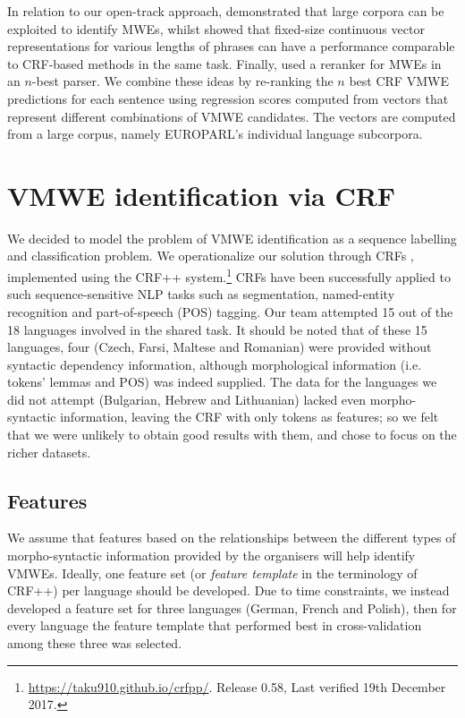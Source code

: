 \documentclass[output=paper
,modfonts
,nonflat]{langsci/langscibook}
\begin{document}
In relation to our open-track approach, \cite{attia2010automatic} demonstrated that large corpora can be exploited to identify MWEs, whilst \cite{legrand2016phrase} showed that fixed-size continuous vector representations for various lengths of phrases can have a performance comparable to CRF-based methods in the same task. Finally, \cite{Constant2012} used a reranker for MWEs in an $n$-best parser. We combine these ideas by re-ranking the $n$ best CRF VMWE predictions for each sentence using regression scores computed from vectors that represent different combinations of VMWE candidates. The vectors are computed from a large corpus, namely EUROPARL's individual language subcorpora.  %


\section{\label{subsec:CRF}VMWE identification via CRF}

We decided to model the problem of VMWE identification as a sequence
labelling and classification problem. We operationalize our solution
through CRFs \citep{Lafferty2001}, implemented using the
CRF++ system.\footnote{\url{https://taku910.github.io/crfpp/}. Release 0.58, Last verified 19th December 2017.} CRFs have
been successfully applied to such sequence-sensitive NLP tasks such as
segmentation, named-entity
recognition \citep{han2013chinese,han2015chinese} and part-of-speech (POS)
tagging. Our team attempted 15 out of the 18 languages involved in the
shared task.  It should be noted that of these 15 languages, four
(Czech, Farsi, Maltese and Romanian) were provided without syntactic
dependency information, although morphological information
(i.e. tokens' lemmas and POS) was indeed supplied.
The data for the languages we did not attempt (Bulgarian, Hebrew and
Lithuanian) lacked even morpho-syntactic information, leaving the CRF
with only tokens as features; so we felt that we were unlikely to
obtain good results with them, and chose to focus on the richer
datasets. 



\subsection{Features}

We assume that features based on the relationships between the
different types of morpho-syntactic information provided by the
organisers will help identify VMWEs. Ideally, one feature set (or
\emph{feature template} in the terminology of CRF++) per language
should be developed. Due to time constraints, we instead developed a
feature set for three languages (German, French and Polish), then for
every language the feature template that performed best in
cross-validation among these three was selected.
\end{document}
